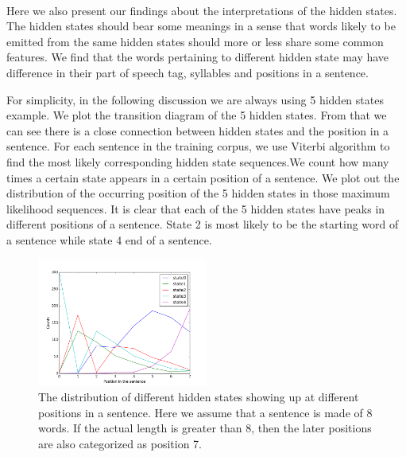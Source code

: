 \paragraph{}
 Here we also present our findings about the interpretations of the hidden states.
The hidden states should bear some meanings in a sense that words likely to be emitted from the same hidden states should more or less share some common features. We find that the words pertaining to different hidden state may have difference in their part of speech tag, syllables and positions in a sentence.

For simplicity, in the following discussion we are always using 5 hidden states example.  We plot the transition diagram of the 5 hidden states. From that we can see there is a close connection between hidden states and the position in a sentence.
For each sentence in the training corpus, we use Viterbi algorithm to find the most likely corresponding hidden state sequences.We count how many times a certain state appears in a certain position of a sentence.  We plot out the distribution of the occurring position of the 5 hidden states in those maximum likelihood sequences. 
It is clear that each of the 5 hidden states have peaks in different positions of a sentence. State 2 is most likely to be the starting word of a sentence while state 4 end of a sentence.
 \begin{figure}[h!]
 \centering
 \includegraphics[width=0.5\textwidth]{../figure/hiddenstates_position_in_the_sentence.png}
 \caption{The distribution of different hidden states showing up at different positions in a sentence. Here we assume that a sentence is made of 8 words. If the actual length is greater than 8, then the later positions are also categorized as position 7.}
 \end{figure}

